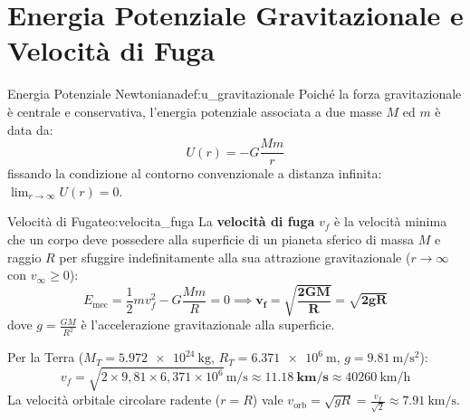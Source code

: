 \section{Energia Potenziale Gravitazionale e Velocità di Fuga}
\label{sec:energia_fuga}

\begin{definizione}{Energia Potenziale Newtoniana}{def:u_gravitazionale}
Poiché la forza gravitazionale è centrale e conservativa, l'energia potenziale associata a due masse $M$ ed $m$ è data da:
\begin{equation}
    U(r) = -G\frac{M m}{r}
    \label{eq:u_newton}
\end{equation}
fissando la condizione al contorno convenzionale a distanza infinita: $\lim_{r\to\infty} U(r) = 0$.
\end{definizione}

\begin{teorema}{Velocità di Fuga}{teo:velocita_fuga}
La \textbf{velocità di fuga} $v_f$ è la velocità minima che un corpo deve possedere alla superficie di un pianeta sferico di massa $M$ e raggio $R$ per sfuggire indefinitamente alla sua attrazione gravitazionale ($r \to \infty$ con $v_\infty \ge 0$):
\begin{equation}
    E_{\text{mec}} = \frac{1}{2}m v_f^2 - G\frac{M m}{R} = 0 \implies \mathbf{v_f = \sqrt{\frac{2 G M}{R}} = \sqrt{2 g R}}
    \label{eq:velocita_fuga}
\end{equation}
dove $g = \frac{GM}{R^2}$ è l'accelerazione gravitazionale alla superficie.
\end{teorema}

\begin{esempio}
Per la Terra ($M_T = \SI{5.972e24}{\kilogram}$, $R_T = \SI{6.371e6}{\metre}$, $g = \SI{9.81}{\metre\per\second\squared}$):
\begin{equation}
    v_f = \sqrt{2 \times 9{,}81 \times 6{,}371\times 10^6}\,\si{\metre\per\second} \approx \mathbf{\SI{11.18}{\kilo\metre\per\second}} \approx \SI{40260}{\kilo\metre\per\hour}
\end{equation}
La velocità orbitale circolare radente ($r = R$) vale $v_{\text{orb}} = \sqrt{g R} = \frac{v_f}{\sqrt{2}} \approx \SI{7.91}{\kilo\metre\per\second}$.
\end{esempio}

